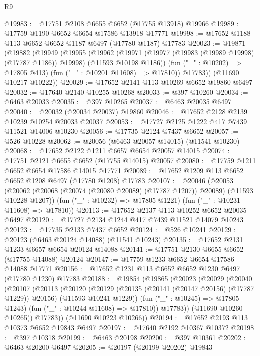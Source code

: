 \begin{lexlean}{R9}
\begin{coremodule}
{{{{{{{{{{{{{{{{{{{{{{{{{{{{{{{{{{{{{{{{{{{{{{{{{{{{{{{{{{{{{{{{{{{{{{{{{{{{{{{{{{{{@19983 := @17751 @2108 @6655 @6652 (@17755 @13918) @19966
@19989 := @17759 @1190 @6652 @6654 @17586 @13918 @17771
@19998 := @17652 @1188 @113 @6652 @6652 @1187 @6497 (@17780 @1187) @17783
@20023 := @19871
    (@19882
      (@19949
        (@19955
          (@19962
            (@19971 (@19977 (@19983 (@19989 @19998) (@17787 @1186)) @19998) (@11593 @10198 @1186))
            (fun ("_" : @10202) => @17805 @413)
            (fun ("_" : @10201 @11608) => @17810))
          @17783))
      (@11690 @10217 @10222))
@20029 := @17652 @2141 @113 @10269 @6652 @19860 @6497
@20032 := @17640 @2140 @10255 @10268
@20033 := @397 @10260
@20034 := @6463 @20033
@20035 := @397 @10265
@20037 := @6463 @20035 @6497
@20040 := @20032 (@20034 @20037) @19860
@20046 := @17652 @2128 @2139 @10239 @10254 @20033 @20037
@20053 := @17727 @2125 @1222 @417 @7439 @11521 @14006 @10230
@20056 := @17735 @2124 @7437 @6652
@20057 := @526 @10228
@20062 := @20056 (@6463 @20057 @14015) (@11541 @10230)
@20068 := @17652 @2122 @1211 @6657 @6654 @20057 @14015
@20074 := @17751 @2121 @6655 @6652 (@17755 @14015) @20057
@20080 := @17759 @1211 @6652 @6654 @17586 @14015 @17771
@20089 := @17652 @1209 @113 @6652 @6652 @1208 @6497 (@17780 @1208) @17783
@20107 := @20046
    (@20053
      (@20062 (@20068 (@20074 (@20080 @20089) (@17787 @1207)) @20089) (@11593 @10228 @1207))
      (fun ("_" : @10232) => @17805 @1221)
      (fun ("_" : @10231 @11608) => @17810))
@20113 := @17652 @2137 @113 @10252 @6652 @20035 @6497
@20120 := @17727 @2134 @1244 @417 @7439 @11521 @14079 @10243
@20123 := @17735 @2133 @7437 @6652
@20124 := @526 @10241
@20129 := @20123 (@6463 @20124 @14088) (@11541 @10243)
@20135 := @17652 @2131 @1233 @6657 @6654 @20124 @14088
@20141 := @17751 @2130 @6655 @6652 (@17755 @14088) @20124
@20147 := @17759 @1233 @6652 @6654 @17586 @14088 @17771
@20156 := @17652 @1231 @113 @6652 @6652 @1230 @6497 (@17780 @1230) @17783
@20188 := @19854
    (@19865
      (@20023
        (@20029
          (@20040
            (@20107
              (@20113
                (@20120
                  (@20129
                    (@20135 (@20141 (@20147 @20156) (@17787 @1229)) @20156)
                    (@11593 @10241 @1229))
                  (fun ("_" : @10245) => @17805 @1243)
                  (fun ("_" : @10244 @11608) => @17810))
                @17783))
            (@11690 @10260 @10265))
          @17783))
      (@11690 @10223 @10266))
@20194 := @17652 @2193 @113 @10373 @6652 @19843 @6497
@20197 := @17640 @2192 @10367 @10372
@20198 := @397 @10318
@20199 := @6463 @20198
@20200 := @397 @10361
@20202 := @6463 @20200 @6497
@20205 := @20197 (@20199 @20202) @19843
}}}}}}}}}}}}}}}}}}}}}}}}}}}}}}}}}}}}}}}}}}}}}}}}}}}}}}}}}}}}}}}}}}}}}}}}}}}}}}}}}}}}
\end{coremodule}
\end{lexlean}
